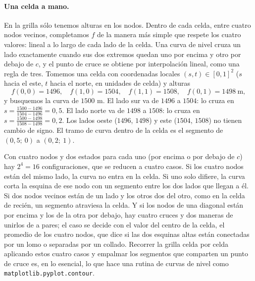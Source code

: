 \paragraph{Una celda a mano.} En la grilla sólo tenemos alturas en los nodos. Dentro de cada
celda, entre cuatro nodos vecinos, completamos \(f\) de la manera más simple que respete los
cuatro valores: lineal a lo largo de cada lado de la celda. Una curva de nivel cruza un lado
exactamente cuando sus dos extremos quedan uno por encima y otro por debajo de \(c\), y el
punto de cruce se obtiene por interpolación lineal, como una regla de tres. Tomemos una celda
con coordenadas locales \((s,t)\in[0,1]^2\) (\(s\) hacia el este, \(t\) hacia el norte, en
unidades de celda) y alturas
\[
  f(0,0)=1496,\quad f(1,0)=1504,\quad f(1,1)=1508,\quad f(0,1)=1498\ \text{m},
\]
y busquemos la curva de \(1500\) m. El lado sur va de \(1496\) a \(1504\): lo cruza en
\(s=\frac{1500-1496}{1504-1496}=0{,}5\). El lado norte va de \(1498\) a \(1508\): lo cruza en
\(s=\frac{1500-1498}{1508-1498}=0{,}2\). Los lados oeste (\(1496\), \(1498\)) y este
(\(1504\), \(1508\)) no tienen cambio de signo. El tramo de curva dentro de la celda es el
segmento de \((0{,}5;\ 0)\) a \((0{,}2;\ 1)\).

\begin{center}
\end{center}

Con cuatro nodos y dos estados para cada uno (por encima o por debajo de \(c\)) hay
\(2^4=16\) configuraciones, que se reducen a cuatro casos. Si los cuatro nodos están del mismo
lado, la curva no entra en la celda. Si uno solo difiere, la curva corta la esquina de ese
nodo con un segmento entre los dos lados que llegan a él. Si dos nodos vecinos están de un
lado y los otros dos del otro, como en la celda de recién, un segmento atraviesa la celda.
Y si los nodos de una diagonal están por encima y los de la otra por debajo, hay cuatro
cruces y dos maneras de unirlos de a pares; el caso se decide con el valor del centro de la
celda, el promedio de los cuatro nodos, que dice si las dos esquinas altas están conectadas
por un lomo o separadas por un collado. Recorrer la grilla celda por celda aplicando estos
cuatro casos y empalmar los segmentos que comparten un punto de cruce es, en lo esencial, lo que
hace una rutina de curvas de nivel como \texttt{matplotlib.pyplot.contour}.

